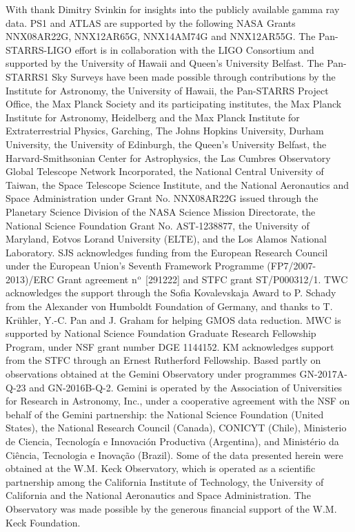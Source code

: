 \documentclass[twocolumn]{aastex61}
\begin{document}
\acknowledgments
With thank Dimitry Svinkin for insights into the publicly
available gamma ray data. 
PS1 and ATLAS are supported by the following NASA Grants
NNX08AR22G, NNX12AR65G, NNX14AM74G and
NNX12AR55G. The Pan-STARRS-LIGO effort is in collaboration with the LIGO Consortium and supported by the University of Hawaii and Queen's University Belfast.  The Pan-STARRS1 Sky Surveys have been made possible through contributions by the Institute for Astronomy, the University of Hawaii, the Pan-STARRS Project Office, the Max Planck Society and its participating institutes, the Max Planck Institute for Astronomy, Heidelberg and the Max Planck Institute for Extraterrestrial Physics, Garching, The Johns Hopkins University, Durham University, the University of Edinburgh, the Queen's University Belfast, the Harvard-Smithsonian Center for Astrophysics, the Las Cumbres Observatory Global Telescope Network Incorporated, the National Central University of Taiwan, the Space Telescope Science Institute, and the National Aeronautics and Space Administration under Grant No. NNX08AR22G issued through the Planetary Science Division of the NASA Science Mission Directorate, the National Science Foundation Grant No. AST-1238877, the University of Maryland, Eotvos Lorand University (ELTE), and the Los Alamos National Laboratory.  SJS acknowledges funding from the European Research Council under the European Union's Seventh Framework Programme (FP7/2007-2013)/ERC Grant agreement n$^{\rm o}$ [291222] and  STFC grant 
ST/P000312/1. TWC acknowledges the support through the Sofia Kovalevskaja Award to P. Schady from the Alexander von Humboldt Foundation of Germany, and thanks to T. Kr\"uhler, Y.-C. Pan and J. Graham for helping GMOS data reduction. MWC is supported by National Science Foundation Graduate Research Fellowship Program, under NSF grant number DGE 1144152. KM acknowledges support from the STFC through an Ernest Rutherford Fellowship.  Based partly on observations obtained at the Gemini Observatory under 
programmes GN-2017A-Q-23 and GN-2016B-Q-2. Gemini is 
operated by the Association of Universities for Research in Astronomy, Inc., under a cooperative agreement with the NSF on behalf of the Gemini partnership: the National Science Foundation (United States), the National Research Council (Canada), CONICYT (Chile), Ministerio de Ciencia, Tecnolog\'{i}a e Innovaci\'{o}n Productiva (Argentina), and Minist\'{e}rio da Ci\^{e}ncia, Tecnologia e Inova\c{c}\~{a}o (Brazil).
Some of the data presented herein were obtained at the W.M. Keck Observatory, which is operated as a scientific partnership among the California Institute of Technology, the University of California and the National Aeronautics and Space Administration. The Observatory was made possible by the generous financial support of the W.M. Keck Foundation.






\end{document}
